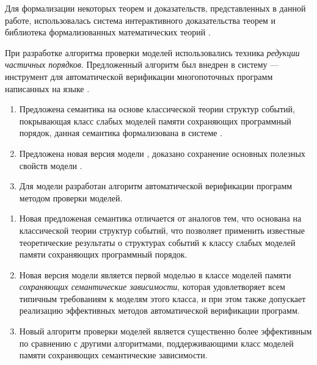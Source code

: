 Для формализации некоторых теорем и доказательств, представленных в данной работе, 
использовалась система интерактивного доказательства теорем \coq 
и библиотека формализованных математических теорий \mathcomp.

При разработке алгоритма проверки моделей использовались техника \emph{редукции частичных порядков}.
Предложенный алгоритм был внедрен в систему \genmc --- 
инструмент для автоматической верификации многопоточных программ написанных на языке \CLANG.

{}
\begin{enumerate}[beginpenalty=10000] %
  \item Предложена семантика на основе классической теории структур событий, 
    покрывающая класс слабых моделей памяти сохраняющих программный порядок,
    данная семантика формализована в системе \coq.
  \item Предложена новая версия модели , 
    доказано сохранение основных полезных свойств модели \Wkm.
  \item Для модели  разработан алгоритм автоматической 
    верификации программ методом проверки моделей.
\end{enumerate}

{\novelty}
\begin{enumerate}[beginpenalty=10000] %

  \item Новая предложеная семантика отличается от аналогов тем, 
    что основана на классической теории структур событий, 
    что позволяет применить известные теоретические результаты 
    о структурах событий к классу слабых моделей памяти сохраняющих программный порядок.

  \item Новая версия модели  является первой моделью в классе 
    моделей памяти \emph{сохраняющих семантические зависимости}, 
    которая удовлетворяет всем типичным требованиям к моделям этого класса, 
    и при этом также допускает реализацию эффективных методов автоматической верификации программ. 

  \item Новый алгоритм проверки моделей является существенно более эффективным 
    по сравнению с другими алгоритмами, поддерживающими 
    класс моделей памяти сохраняющих семантические зависимости.

\end{enumerate}

